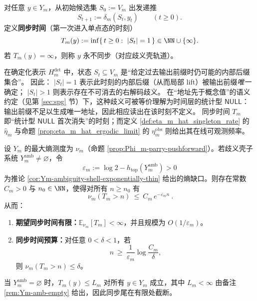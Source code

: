 \begin{definition}[同步时间与同步尾]\label{def:Ym-sync-time}
对任意 \(y\in Y_m\)，从初始候选集 \(S_0:=V_m\) 出发递推
\[
S_{t+1}:=\delta_m(S_t,y_t)\qquad (t\ge 0).
\]
定义\textbf{同步时间}（第一次进入单点态的时刻）
\[
T_m(y):=\inf\{\,t\ge 0:\ |S_t|=1\,\}\in\NN\cup\{\infty\}.
\]
若 \(T_m(y)=\infty\)，则称 \(y\) 永不同步（对应歧义壳轨道）。
\end{definition}

\begin{remark}\label{rem:Ym-stat-null-unsync}
在确定化表示 \(H_m^{\mathrm{det}}\) 中，状态 \(S_t\subseteq V_m\) 是“给定过去输出前缀时仍可能的内部后缀集合”。
因此：
\(|S_t|=1\) 表示此时刻的内部后缀（从而局部 lift）被输出前缀\emph{唯一}确定；
\(|S_t|>1\) 则表示存在不可消去的右解码歧义。
在“地址先于概念值”的语义约定（见第 \ref{sec:spg} 节）下，这种歧义可被等价理解为时间层的统计型 \(\mathsf{NULL}\)：输出前缀不足以生成唯一地址，因此相应读出在该时刻不定义。
同步时间 \(T_m\) 即“统计型 \(\mathsf{NULL}\) 首次消失”的时刻；而定义 \ref{def:eta_m_hat_singleton_rate} 的 \(\widehat\eta_m\) 与命题 \ref{prop:eta_m_hat_ergodic_limit} 的 \(\eta_m^{\mathrm{obs}}\) 则给出其在线可观测频率。
\end{remark}

\begin{theorem}\label{thm:Ym-sync-tail}
设 \(Y_m\) 的最大熵测度为 \(\nu_m\)（命题 \ref{prop:Phi_m-parry-pushforward}）。若歧义壳子系统 \(Y_m^{\mathrm{amb}}\neq\varnothing\)，令
\[
\varepsilon_m:=\log 2-h_{\mathrm{top}}(Y_m^{\mathrm{amb}})>0
\]
为推论 \ref{cor:Ym-ambiguity-shell-exponentially-thin} 给出的熵缺口。则存在常数 \(C_m>0\) 与 \(n_0\in\NN\)，使得对所有 \(n\ge n_0\) 有
\[
\boxed{\ \nu_m(T_m>n)\ \le\ C_m\,e^{-\varepsilon_m n}\ }.
\]
从而：
\begin{enumerate}
  \item \textbf{期望同步时间有限：}\(\mathbb{E}_{\nu_m}[T_m]<\infty\)，并且规模为 \(O(1/\varepsilon_m)\)。
  \item \textbf{同步时间预算：}对任意 \(0<\delta<1\)，若
  \[
  n\ \ge\ \frac{1}{\varepsilon_m}\log\frac{C_m}{\delta},
  \]
  则 \(\nu_m(T_m>n)\le \delta\)。
\end{enumerate}
当 \(Y_m^{\mathrm{amb}}=\varnothing\) 时，\(T_m(y)\le L_m\) 对所有 \(y\in Y_m\) 成立，其中 \(L_m<\infty\) 由备注 \ref{rem:Ym-amb-empty} 给出，因此同步尾在有限处截断。
\end{theorem}

